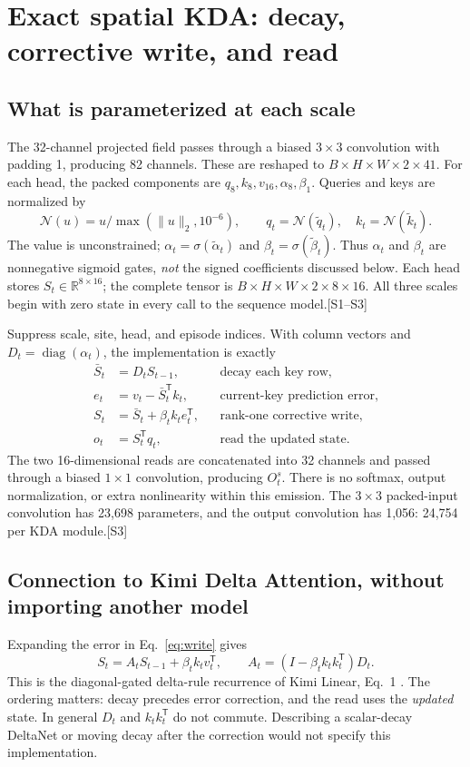 \documentclass[10pt,letterpaper]{article}
\newcommand{\R}{\mathbb{R}}
\newcommand{\src}[1]{\textcolor{accent}{\textsf{[#1]}}}
\newcommand{\psection}[1]{\clearpage\section{#1}}
\begin{document}
\psection{Exact spatial KDA: decay, corrective write, and read}
\subsection{What is parameterized at each scale}
The 32-channel projected field passes through a biased $3\times3$ convolution with padding 1, producing 82 channels. These are reshaped to $B\times H\times W\times2\times41$. For each head, the packed components are $q_8,k_8,v_{16},\alpha_8,\beta_1$. Queries and keys are normalized by
\begin{equation}
\mathcal N(u)=u/\max(\lVert u\rVert_2,10^{-6}),\qquad
q_t=\mathcal N(\tilde q_t),\quad k_t=\mathcal N(\tilde k_t).
\end{equation}
The value is unconstrained; $\alpha_t=\sigma(\tilde\alpha_t)$ and $\beta_t=\sigma(\tilde\beta_t)$. Thus $\alpha_t$ and $\beta_t$ are nonnegative sigmoid gates, \emph{not} the signed coefficients discussed below. Each head stores $S_t\in\R^{8\times16}$; the complete tensor is $B\times H\times W\times2\times8\times16$. All three scales begin with zero state in every call to the sequence model.\src{S1--S3}

Suppress scale, site, head, and episode indices. With column vectors and $D_t=\operatorname{diag}(\alpha_t)$, the implementation is exactly
\begin{align}
\bar S_t &= D_t S_{t-1}, &&\text{decay each key row},\label{eq:decay}\\
e_t &= v_t-\bar S_t^{\mathsf T}k_t, &&\text{current-key prediction error},\\
S_t &= \bar S_t+\beta_t k_t e_t^{\mathsf T}, &&\text{rank-one corrective write},\label{eq:write}\\
o_t &= S_t^{\mathsf T}q_t, &&\text{read the updated state}.\label{eq:read}
\end{align}
The two 16-dimensional reads are concatenated into 32 channels and passed through a biased $1\times1$ convolution, producing $O_t^s$. There is no softmax, output normalization, or extra nonlinearity within this emission. The $3\times3$ packed-input convolution has 23,698 parameters, and the output convolution has 1,056: 24,754 per KDA module.\src{S3}

\subsection{Connection to Kimi Delta Attention, without importing another model}
Expanding the error in Eq.~\eqref{eq:write} gives
\begin{equation}
S_t=A_tS_{t-1}+\beta_t k_tv_t^{\mathsf T},\qquad
A_t=(I-\beta_t k_tk_t^{\mathsf T})D_t.\label{eq:transition}
\end{equation}
This is the diagonal-gated delta-rule recurrence of Kimi Linear, Eq.~1 \cite{kda}. The ordering matters: decay precedes error correction, and the read uses the \emph{updated} state. In general $D_t$ and $k_tk_t^{\mathsf T}$ do not commute. Describing a scalar-decay DeltaNet or moving decay after the correction would not specify this implementation.
\end{document}
